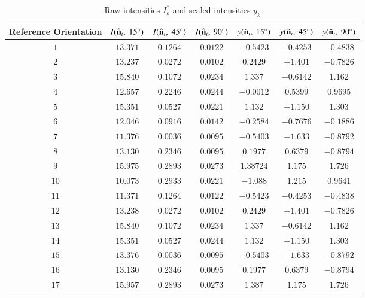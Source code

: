 \documentclass[final, 3p]{elsarticle}
\begin{document}
\newpage
\begin{table}[h]
  \begin{center}
    \caption{\label{tab:A2}
      Raw intensities $I_k^*$ and scaled intensities $y_k$}
    \begin{tabular}{|c|c|c|c|c|c|c|}
      \hline\hline
      Reference Orientation  & $I(\hat{\bf n}_i,\ 15^{\circ})$ &  $I(\hat{\bf n}_i, \ 45^{\circ})$ &  $I(\hat{\bf n}_i,\ 90^{\circ})$ & $y(\hat{\bf n}_i, \ 15^{\circ})$ & $y(\hat{\bf n}_i, \ 45^{\circ})$ & $y(\hat{\bf n}_i, \ 90^{\circ})$ \\
\hline
$1$ & $13.371$ & $0.1264$ & $0.0122$ & $-0.5423$ & $-0.4253$ & $-0.4838$ \\
$2$ & $13.237$ & $0.0272$ & $0.0102$ & $0.2429$ & $-1.401$ & $-0.7826$ \\
$3$ & $15.840$ & $0.1072$ & $0.0234$ & $1.337$ &$-0.6142$&	$1.162$ \\
$4$ & $12.657$ & $0.2246$ & $0.0244$ & $-0.0012$ &	$0.5399$ & $0.9695$ \\
$5$ & $15.351$ & $0.0527$ & $0.0221$ & $1.132$ &	$-1.150$ & $1.303$ \\
$6$ & $12.046$ & $0.0916$ & $0.0142$ & $-0.2584$ &	$-0.7676$ &	$-0.1886$ \\
$7$ & $11.376$ & $0.0036$ & $0.0095$ & $-0.5403$ &$-1.633$ & $-0.8792$ \\
$8$ & $13.130$ & $0.2346$ & $0.0095$ & $0.1977$ & $0.6379$ & $-0.8794$ \\
$9$ & $15.975$ & $0.2893$ & $0.0273$ & $1.38724$ & $1.175$ & $1.726$ \\
$10$ & $10.073$ & $0.2933$ & $0.0221$ & $-1.088$	& $1.215$ & $0.9641$ \\
$11$ & $11.371$ & $0.1264$ & $0.0122$ & $-0.5423$ & $-0.4253$ & $-0.4838$ \\
$12$ & $13.238$ & $0.0272$ & $0.0102$ & $0.2429$ &	$-1.401$ & $-0.7826$ \\
$13$ & $15.840$ & $0.1072$ & $0.0234$ & $1.337$ &	$-0.6142$ & $1.162$ \\
$14$ & $15.351$ & $0.0527$ & $0.0244$ & $1.132$ & $-1.150$ & $1.303$ \\
$15$ & $13.376$ & $0.0036$ & $0.0095$ & $-0.5403$ & $-1.633$ & $-0.8792$ \\
$16$ & $13.130$ & $0.2346$ & $0.0095$ & $0.1977$ & $0.6379$ & $-0.8794$ \\
$17$ & $15.957$ & $0.2893$ & $0.0273$ & $1.387$	& $1.175$	& $1.726$ \\

\end{tabular}
\end{center}
\end{table}
\end{document}
